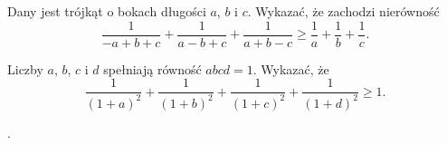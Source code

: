 



\noindent
Dany jest trójkąt o bokach długości $a$, $b$ i $c$. Wykazać, że zachodzi nierówność
\[
	\frac{1}{-a + b + c} + \frac{1}{a - b + c} + \frac{1}{a + b - c} \geqslant \frac{1}{a} + \frac{1}{b} + \frac{1}{c}.
\]



\noindent
Liczby $a$, $b$, $c$ i $d$ spełniają równość $abcd = 1$. Wykazać, że
\[
	\frac{1}{(1 + a)^2} + \frac{1}{(1 + b)^2} + \frac{1}{(1 + c)^2} + \frac{1}{(1 + d)^2} \geqslant 1.
\]

.